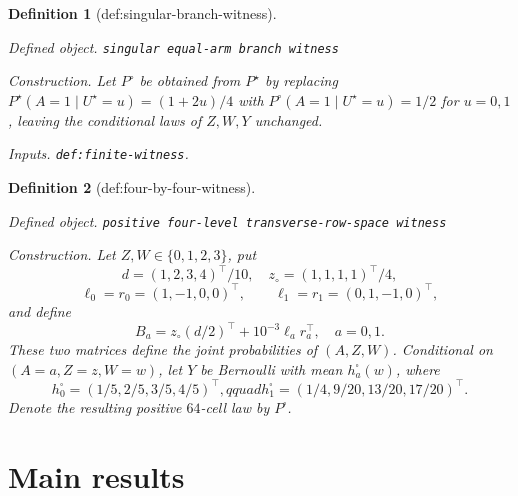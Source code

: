 \documentclass{article}
\newtheorem{definition}{Definition}
\begin{document}
\begin{definition}[def:singular-branch-witness]\label{def:singular-branch-witness}
\par\smallskip\noindent\emph{Defined object.} \texttt{singular equal-\allowbreak{}arm branch witness}
\par\smallskip\noindent\emph{Construction.} Let \(P^\circ\) be obtained from \(P^\star\) by replacing \(P^\star(A=1\mid U^\star=u)=(1+2u)/4\) with \(P^\circ(A=1\mid U^\star=u)=1/2\) for \(u=0,1\), leaving the conditional laws of \(Z,W,Y\) unchanged.
\par\smallskip\noindent\emph{Inputs.} \texttt{def:\allowbreak{}finite-\allowbreak{}witness}.
\end{definition}

\begin{definition}[def:four-by-four-witness]\label{def:four-by-four-witness}
\par\smallskip\noindent\emph{Defined object.} \texttt{positive four-\allowbreak{}level transverse-\allowbreak{}row-\allowbreak{}space witness}
\par\smallskip\noindent\emph{Construction.} Let \(Z,W\in\{0,1,2,3\}\), put
\[
d=(1,2,3,4)^\top/10,\quad z_\circ=(1,1,1,1)^\top/4,
\]
\[
\ell_0=r_0=(1,-1,0,0)^\top,\qquad
\ell_1=r_1=(0,1,-1,0)^\top,
\]
and define
\[
B_a=z_\circ(d/2)^\top+10^{-3}\ell_ar_a^\top,
\quad a=0,1.
\]
These two matrices define the joint probabilities of \((A,Z,W)\). Conditional on \((A=a,Z=z,W=w)\), let \(Y\) be Bernoulli with mean \(h_a^\square(w)\), where
\[
h_0^\square=(1/5,2/5,3/5,4/5)^\top,qquad
h_1^\square=(1/4,9/20,13/20,17/20)^\top.
\]
Denote the resulting positive \(64\)-cell law by \(P^\square\).
\end{definition}

\section{Main results}
\end{document}
